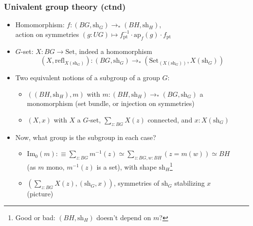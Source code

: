 \documentclass[handout,11pt]{beamer}
\newcommand{\defeq}{:\equiv}
\newcommand{\sh}{\mathrm{sh}}
\newcommand{\refl}{\mathrm{refl}}
\newcommand{\Set}{\mathrm{Set}}
\newcommand{\im}{\mathrm{Im}_0}
\newcommand{\ptdto}{\to_\ast}
\newcommand{\pt}{\mathrm{pt}}
\newcommand{\ap}[1]{\mathrm{ap}_{#1}}
\begin{document}
\begin{frame}
\frametitle{Univalent group theory (ctnd)}
 \begin{itemize}[<+->]
\item Homomorphism: $f: (BG,\sh_G)\ptdto(BH,\sh_H)$,\\
action on symmetries $(g:UG)\mapsto f_\pt^{-1}\cdot \ap{f}(g)\cdot f_\pt$
\item $G$-set: $X: BG\to\Set$, indeed a homomorphism 
$$(X,\refl_{X(\sh_G)}): (BG,\sh_G)\ptdto(\Set_{(X(\sh_G))},X(\sh_G))$$
\item Two equivalent notions of a subgroup of a group $G$:
\begin{itemize}[<+->]
\item $((BH,\sh_H),m)$ with $m:(BH,\sh_H)\ptdto (BG,\sh_G)$ a monomorphism
(set bundle, or injection on symmetries)
\item $(X,x)$ with $X$ a $G$-set, $\sum_{z:BG} X(z)$ connected, and $x:X(\sh_G)$
\end{itemize} 
\item Now, what group is the subgroup in each case?
\begin{itemize}[<+->]
\item $\im(m)\defeq\sum_{z:BG}m^{-1}(z)\simeq\sum_{z:BG,w:BH}(z=m(w))\simeq BH$\\
(as $m$ mono, $m^{-1}(z)$ is a set),
with shape $\sh_H$\footnote{Good or bad: $(BH,\sh_H)$ doesn't depend on $m$?}
\item $(\sum_{z:BG} X(z), (\sh_G,x))$, symmetries of $\sh_G$ stabilizing $x$\\
(picture)
\end{itemize} 
\end{itemize}
\end{frame}
\end{document}
